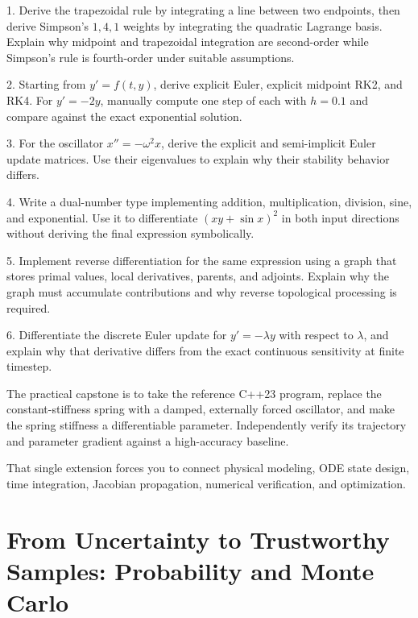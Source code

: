 1. Derive the trapezoidal rule by integrating a line between two endpoints, then derive Simpson's \(1,4,1\) weights by integrating the quadratic Lagrange basis. Explain why midpoint and trapezoidal integration are second-order while Simpson's rule is fourth-order under suitable assumptions.

2. Starting from \(y'=f(t,y)\), derive explicit Euler, explicit midpoint RK2, and RK4. For \(y'=-2y\), manually compute one step of each with \(h=0.1\) and compare against the exact exponential solution.

3. For the oscillator \(x''=-\omega^2x\), derive the explicit and semi-implicit Euler update matrices. Use their eigenvalues to explain why their stability behavior differs.

4. Write a dual-number type implementing addition, multiplication, division, sine, and exponential. Use it to differentiate \((xy+\sin x)^2\) in both input directions without deriving the final expression symbolically.

5. Implement reverse differentiation for the same expression using a graph that stores primal values, local derivatives, parents, and adjoints. Explain why the graph must accumulate contributions and why reverse topological processing is required.

6. Differentiate the discrete Euler update for \(y'=-\lambda y\) with respect to \(\lambda\), and explain why that derivative differs from the exact continuous sensitivity at finite timestep.

The practical capstone is to take the reference C++23 program, replace the constant-stiffness spring with a damped, externally forced oscillator, and make the spring stiffness a differentiable parameter. Independently verify its trajectory and parameter gradient against a high-accuracy baseline.

That single extension forces you to connect physical modeling, ODE state design, time integration, Jacobian propagation, numerical verification, and optimization.

\section{From Uncertainty to Trustworthy Samples: Probability and Monte Carlo}\label{02-foundations-ii-ch022-from-uncertainty-to-trustworthy-samples-probability-and-monte-carlo}

\hypertarget{02-foundations-ii-ch022-from-uncertainty-to-trustworthy-samples-probability-and-monte-carlo}{}

